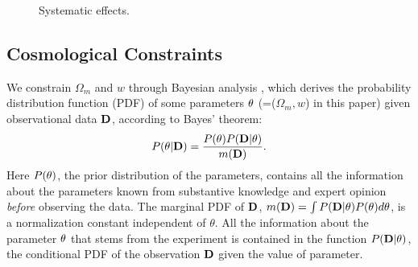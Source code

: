 \documentclass[iop]{emulateapj}
\begin{document}
\begin{figure}
   \caption{\label{fig_sys}
  Systematic effects.
   }
\end{figure}
\subsection{Cosmological Constraints}


We constrain $\Omega_m$ and $w$ through Bayesian analysis \citep{Bayesian},
which derives the probability distribution function (PDF) of some parameters $\bf \theta$ (=($\Omega_m,w$) in this paper)
given observational data $\bf D$, 
according to Bayes' theorem:
\begin{equation}
 P({\bf \theta}|{\bf D}) = \frac{P({\bf \theta})P({\bf D}|{\bf \theta})}{m({\bf D})}.
\end{equation}
Here $P(\bf \theta)$, the prior distribution of the parameters,
contains all the information about the parameters known from substantive knowledge 
and expert opinion {\it before} observing the data.
The marginal PDF of $\bf D$, 
$m({\bf D})=\int P({\bf D|\theta})P({\bf \theta})d{\bf \theta}$, 
is a normalization constant independent of $\theta$.
All the information about the parameter $\bf \theta$ that stems from the experiment
is contained in the function $P({\bf D}|{\bf \theta})$, 
the conditional PDF of the observation $\bf D$ given the value of parameter.
\end{document}
